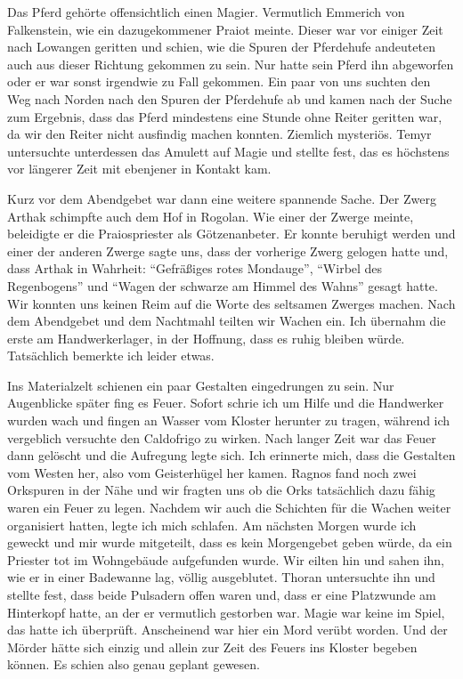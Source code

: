 Das Pferd gehörte offensichtlich einen Magier. Vermutlich Emmerich von Falkenstein, wie ein dazugekommener Praiot meinte. Dieser war vor einiger Zeit nach Lowangen geritten und schien, wie die Spuren der Pferdehufe andeuteten auch aus dieser Richtung gekommen zu sein. Nur hatte sein Pferd ihn abgeworfen oder er war sonst irgendwie zu Fall gekommen. Ein paar von uns suchten den Weg nach Norden nach den Spuren der Pferdehufe ab und kamen nach der Suche zum Ergebnis, dass das Pferd mindestens eine Stunde ohne Reiter geritten war, da wir den Reiter nicht ausfindig machen konnten. Ziemlich mysteriös. Temyr untersuchte unterdessen das Amulett auf Magie und stellte fest, das es höchstens vor längerer Zeit mit ebenjener in Kontakt kam.


Kurz vor dem Abendgebet war dann eine weitere spannende Sache. Der Zwerg Arthak schimpfte auch dem Hof in Rogolan. Wie einer der Zwerge meinte, beleidigte er die Praiospriester als Götzenanbeter. Er konnte beruhigt werden und einer der anderen Zwerge sagte uns, dass der vorherige Zwerg gelogen hatte und, dass Arthak in Wahrheit: ``Gefräßiges rotes Mondauge'', ``Wirbel des Regenbogens'' und ``Wagen der schwarze am Himmel des Wahns'' gesagt hatte. Wir konnten uns keinen Reim auf die Worte des seltsamen Zwerges machen. Nach dem Abendgebet und dem Nachtmahl teilten wir Wachen ein. Ich übernahm die erste am Handwerkerlager, in der Hoffnung, dass es ruhig bleiben würde. Tatsächlich bemerkte ich leider etwas.


Ins Materialzelt schienen ein paar Gestalten eingedrungen zu sein. Nur Augenblicke später fing es Feuer. Sofort schrie ich um Hilfe und die Handwerker wurden wach und fingen an Wasser vom Kloster herunter zu tragen, während ich vergeblich versuchte den Caldofrigo zu wirken. Nach langer Zeit war das Feuer dann gelöscht und die Aufregung legte sich. Ich erinnerte mich, dass die Gestalten vom Westen her, also vom Geisterhügel her kamen. Ragnos fand noch zwei Orkspuren in der Nähe und wir fragten uns ob die Orks tatsächlich dazu fähig waren ein Feuer zu legen. Nachdem wir auch die Schichten für die Wachen weiter organisiert hatten, legte ich mich schlafen. Am nächsten Morgen wurde ich geweckt und mir wurde mitgeteilt, dass es kein Morgengebet geben würde, da ein Priester tot im Wohngebäude aufgefunden wurde. Wir eilten hin und sahen ihn, wie er in einer Badewanne lag, völlig ausgeblutet. Thoran untersuchte ihn und stellte fest, dass beide Pulsadern offen waren und, dass er eine Platzwunde am Hinterkopf hatte, an der er vermutlich gestorben war. Magie war keine im Spiel, das hatte ich überprüft. Anscheinend war hier ein Mord verübt worden. Und der Mörder hätte sich einzig und allein zur Zeit des Feuers ins Kloster begeben können. Es schien also genau geplant gewesen. 


